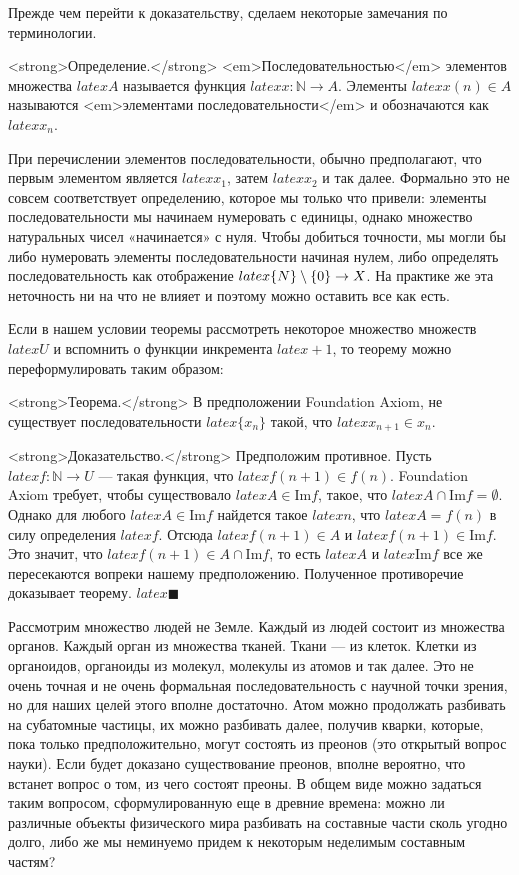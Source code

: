 Прежде чем перейти к доказательству, сделаем некоторые замечания по терминологии.

<strong>Определение.</strong> <em>Последовательностью</em> элементов множества $latex A$ называется функция $latex x:\mathbb{N}\to A$. Элементы $latex x(n)\in A$ называются <em>элементами последовательности</em> и обозначаются как $latex x_n$.

При перечислении элементов последовательности, обычно предполагают, что первым элементом является $latex x_1$, затем $latex x_2$ и так далее. Формально это не совсем соответствует определению, которое мы только что привели: элементы последовательности мы начинаем нумеровать с единицы, однако множество натуральных чисел «начинается» с нуля. Чтобы добиться точности, мы могли бы либо нумеровать элементы последовательности начиная нулем, либо определять последовательность как отображение $latex \mathbb\{N\}\setminus \{0\} \to X$. На практике же эта неточность ни на что не влияет и поэтому можно оставить все как есть.

Если в нашем условии теоремы рассмотреть некоторое множество множеств $latex U$ и вспомнить о функции инкремента $latex +1$, то теорему можно переформулировать таким образом:

<strong>Теорема.</strong> В предположении Foundation Axiom, не существует последовательности $latex \{x_n\}$ такой, что $latex x_{n+1} \in x_n$.

<strong>Доказательство.</strong> Предположим противное. Пусть $latex f: \mathbb{N}\to U$ — такая функция, что $latex f(n+1) \in f(n)$. Foundation Axiom требует, чтобы существовало $latex A\in \mathrm{Im} f$, такое, что $latex A \cap \mathrm{Im}f = \emptyset$. Однако для любого $latex A\in \mathrm{Im} f$ найдется такое $latex n$, что $latex A = f(n)$ в силу определения $latex f$. Отсюда $latex f(n+1) \in A$ и $latex f(n+1)\in \mathrm{Im}f$. Это значит, что $latex f(n+1)\in A \cap \mathrm{Im}f$, то есть $latex A$ и $latex \mathrm{Im}f$ все же пересекаются вопреки нашему предположению. Полученное противоречие доказывает теорему. $latex \blacksquare$

Рассмотрим множество людей не Земле. Каждый из людей состоит из множества органов. Каждый орган из множества тканей. Ткани — из клеток. Клетки из органоидов, органоиды из молекул, молекулы из атомов и так далее. Это не очень точная и не очень формальная последовательность с научной точки зрения, но для наших целей этого вполне достаточно. Атом можно продолжать разбивать на субатомные частицы, их можно разбивать далее, получив кварки, которые, пока только предположительно, могут состоять из преонов (это открытый вопрос науки). Если будет доказано существование преонов, вполне вероятно, что встанет вопрос о том, из чего состоят преоны. В общем виде можно задаться таким вопросом, сформулированную еще в древние времена: можно ли различные объекты физического мира разбивать на составные части сколь угодно долго, либо же мы неминуемо придем к некоторым неделимым составным частям?


